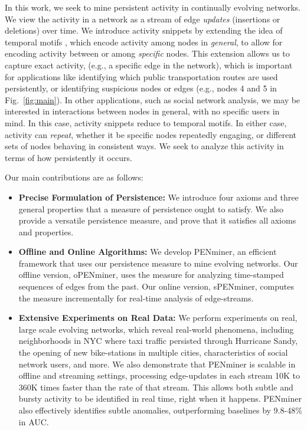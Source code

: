 \documentclass[sigconf]{acmart}
\newcommand{\method}{PENminer\xspace}
\newcommand{\methodOffline}{oPENminer\xspace}
\newcommand{\methodOnline}{sPENminer\xspace}
\begin{document}
In this work, we seek to mine persistent activity in continually evolving networks. We view the activity in a network as a stream of edge \emph{updates} (insertions or deletions) over time. We introduce activity snippets by extending the idea of temporal motifs \cite{paranjape2017motifs}, which encode activity among nodes in \emph{general}, to allow for encoding activity between or among \emph{specific} nodes. This extension allows us to capture exact activity, (e.g., a specific edge in the network), which is important for applications like identifying which public transportation routes are used persistently, or identifying suspicious nodes or edges (e.g., nodes 4 and 5 in Fig.~\ref{fig:main}). In other applications, such as social network analysis, we may be interested in interactions between nodes in general, with no specific users in mind. In this case, activity snippets reduce to temporal motifs. In either case, activity can \emph{repeat}, whether it be specific nodes repeatedly engaging,
or different sets of nodes behaving in consistent ways. We seek to analyze this activity in terms of how persistently it occurs.

Our main contributions are as follows:

\begin{itemize}[leftmargin=*]
    \item \textbf{Precise Formulation of Persistence:} We introduce four axioms and three general properties that a measure of persistence ought to satisfy. We also provide a versatile persistence measure, and prove that it satisfies all axioms and properties.
    \item \textbf{Offline and Online Algorithms:} We develop \method, an efficient framework that uses our persistence measure to mine evolving networks. Our offline version, \methodOffline, uses the measure for analyzing time-stamped sequences of edges from the past. Our online version, \methodOnline, computes the measure incrementally for real-time analysis of edge-streams.  
    \item \textbf{Extensive Experiments on Real Data:} We perform experiments on real, large scale evolving networks, which reveal real-world phenomena, including neighborhoods in NYC where taxi traffic persisted through Hurricane Sandy, the opening of new bike-stations in multiple cities, characteristics of social network users, and more. We also demonstrate that \method is scalable in offline and streaming settings, 
    {processing edge-updates in each stream 10K to 360K times faster than the rate of that stream}. 
    This allows both subtle and bursty activity to be identified in real time, right when it happens. 
    \method also effectively identifies subtle anomalies, outperforming baselines by 9.8-48\% in AUC.
\end{itemize}
\end{document}
